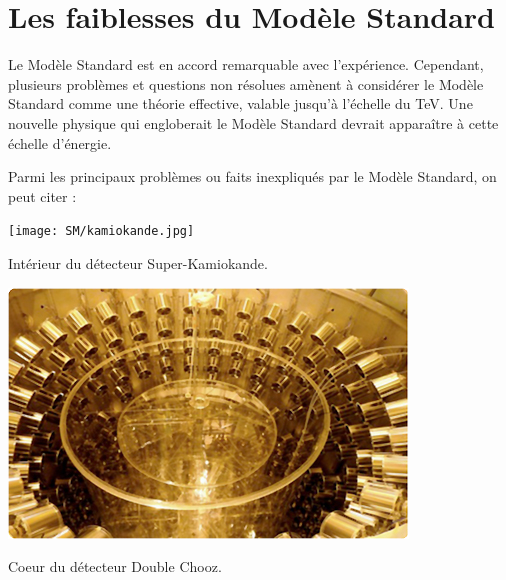 \section{Les faiblesses du Modèle Standard}
\vspace*{-0.5cm}
Le Modèle Standard est en accord remarquable avec l'expérience. Cependant, plusieurs problèmes et questions non résolues amènent à considérer le Modèle Standard comme une théorie effective, valable jusqu'à l'échelle du \si{\tera\eV}. Une nouvelle physique qui engloberait le Modèle Standard devrait apparaître à cette échelle d'énergie.

Parmi les principaux problèmes ou faits inexpliqués par le Modèle Standard, on peut citer :
\marginpar
{
	\centering
	\texttt{[image: SM/kamiokande.jpg]}
	\captionsetup{type=figure}\caption{Intérieur du détecteur Super-Kamiokande.}
	\label{kamiokande}
}
\marginpar
{
	\centering
	\includegraphics[width=\marginparwidth]{SM/chooz.jpg}
	\captionsetup{type=figure}\caption{Coeur du détecteur Double Chooz.}
	\label{chooz}
} 

